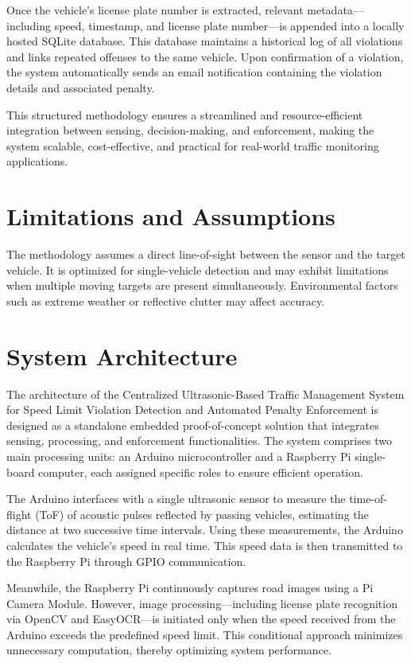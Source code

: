 Once the vehicle’s license plate number is extracted, relevant metadata—including speed, timestamp, and license plate number—is appended into a locally hosted SQLite database. This database maintains a historical log of all violations and links repeated offenses to the same vehicle. Upon confirmation of a violation, the system automatically sends an email notification containing the violation details and associated penalty.

This structured methodology ensures a streamlined and resource-efficient integration between sensing, decision-making, and enforcement, making the system scalable, cost-effective, and practical for real-world traffic monitoring applications.


\section{Limitations and Assumptions}

The methodology assumes a direct line-of-sight between the sensor and the target vehicle. It is optimized for single-vehicle detection and may exhibit limitations when multiple moving targets are present simultaneously. Environmental factors such as extreme weather or reflective clutter may affect accuracy.



\section{System Architecture}
\label{sec:system-architecture}
The architecture of the Centralized Ultrasonic-Based Traffic Management System for Speed Limit Violation Detection and Automated Penalty Enforcement is designed as a standalone embedded proof-of-concept solution that integrates sensing, processing, and enforcement functionalities. The system comprises two main processing units: an Arduino microcontroller and a Raspberry Pi single-board computer, each assigned specific roles to ensure efficient operation.

The Arduino interfaces with a single ultrasonic sensor to measure the time-of-flight (ToF) of acoustic pulses reflected by passing vehicles, estimating the distance at two successive time intervals. Using these measurements, the Arduino calculates the vehicle’s speed in real time. This speed data is then transmitted to the Raspberry Pi through GPIO communication.

Meanwhile, the Raspberry Pi continuously captures road images using a Pi Camera Module. However, image processing—including license plate recognition via OpenCV and EasyOCR—is initiated only when the speed received from the Arduino exceeds the predefined speed limit. This conditional approach minimizes unnecessary computation, thereby optimizing system performance.

